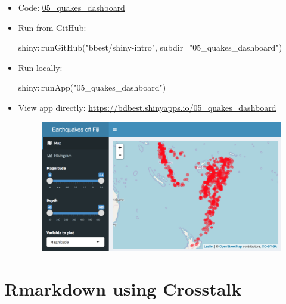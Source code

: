\documentclass[
  letterpaper,
  DIV=11,
  numbers=noendperiod]{scrreprt}
\newenvironment{Shaded}{\begin{snugshade}}{\end{snugshade}}
\newcommand{\AttributeTok}[1]{\textcolor[rgb]{0.40,0.45,0.13}{#1}}
\newcommand{\FunctionTok}[1]{\textcolor[rgb]{0.28,0.35,0.67}{#1}}
\newcommand{\NormalTok}[1]{\textcolor[rgb]{0.00,0.23,0.31}{#1}}
\newcommand{\SpecialCharTok}[1]{\textcolor[rgb]{0.37,0.37,0.37}{#1}}
\newcommand{\StringTok}[1]{\textcolor[rgb]{0.13,0.47,0.30}{#1}}
\begin{document}
\begin{itemize}
\item
  Code:
  \href{https://github.com/bbest/shiny-intro/tree/master/05_quakes_dashboard}{05\_quakes\_dashboard}
\item
  Run from GitHub:

\begin{Shaded}
\begin{Highlighting}[]
\NormalTok{shiny}\SpecialCharTok{::}\FunctionTok{runGitHub}\NormalTok{(}\StringTok{"bbest/shiny{-}intro"}\NormalTok{, }\AttributeTok{subdir=}\StringTok{"05\_quakes\_dashboard"}\NormalTok{)}
\end{Highlighting}
\end{Shaded}
\item
  Run locally:

\begin{Shaded}
\begin{Highlighting}[]
\NormalTok{shiny}\SpecialCharTok{::}\FunctionTok{runApp}\NormalTok{(}\StringTok{"05\_quakes\_dashboard"}\NormalTok{)}
\end{Highlighting}
\end{Shaded}
\item
  View app directly:
  \url{https://bdbest.shinyapps.io/05_quakes_dashboard}

  \begin{figure}

  {\centering 

  \href{https://bdbest.shinyapps.io/05_quakes_dashboard}{\includegraphics{./figs/shiny/screenshot-05_quakes_dashboard.png}}

  }

  \end{figure}
\end{itemize}

\hypertarget{rmarkdown-using-crosstalk}{%
\section{Rmarkdown using Crosstalk}\label{rmarkdown-using-crosstalk}}
\end{document}
